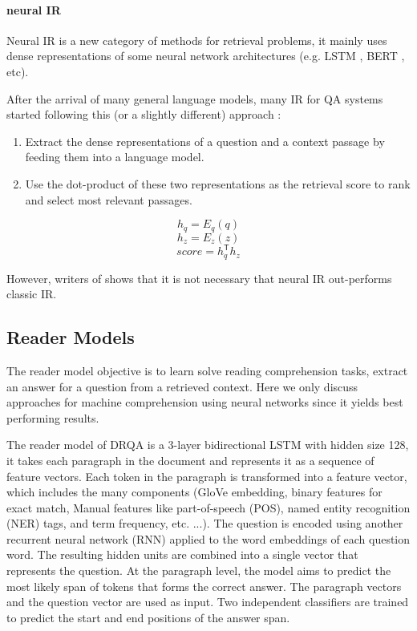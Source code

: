 \documentclass[a4paper,12pt]{article}
\begin{document}
\paragraph{neural IR}
Neural IR is a new category of methods for retrieval problems, it mainly uses dense representations of some neural network architectures (e.g. LSTM \cite{lstm}, BERT \cite{bert}, etc). 

After the arrival of many general language models, many IR for QA systems started following this (or a slightly different) approach :
\begin{enumerate}
	\item Extract the dense representations of a question and a context passage by feeding them into a language model.
	\item Use the dot-product of these two representations as the retrieval score to rank and select most relevant passages.
\end{enumerate}

$$h_q=E_q(q)$$ 
$$h_z=E_z(z)$$
$$score=h_q^\mathsf{T} h_z$$

However, writers of \cite{lin} shows that it is not necessary that neural IR out-performs classic IR.

\subsection{Reader Models}
The reader model objective is to learn solve reading comprehension tasks, extract an answer for a question from a retrieved context. 
Here we only discuss approaches for machine comprehension using neural networks since it yields best performing results.

The reader model of DRQA \cite{drqa} is a 3-layer bidirectional LSTM with hidden size 128, it takes each paragraph in the document and represents it as a sequence of feature vectors. 
Each token in the paragraph is transformed into a feature vector, which includes the many components (GloVe \cite{glove} embedding, binary features for exact match, Manual features like part-of-speech (POS), named entity recognition (NER) tags, and term frequency, etc. ...).
The question is encoded using another recurrent neural network (RNN) applied to the word embeddings of each question word. The resulting hidden units are combined into a single vector that represents the question. At the paragraph level, the model aims to predict the most likely span of tokens that forms the correct answer. The paragraph vectors and the question vector are used as input. 
Two independent classifiers are trained to predict the start and end positions of the answer span.
\end{document}
